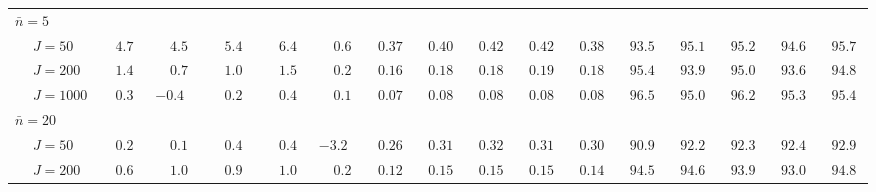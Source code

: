 \begin{sidewaystable}
\begin{threeparttable}
\begin{tabular}{llccccccccccccccc}
\multicolumn{4}{l}{$\bar{n}=5$} \\  & \nopagebreak $\;J=50$  & $\phantom{-}4.7\phantom{0}$ & $\phantom{-}4.5\phantom{0}$ & $\phantom{-}5.4\phantom{0}$ & $\phantom{-}6.4\phantom{0}$ & $\phantom{-}0.6\phantom{0}$ & $\phantom{0}0.37\phantom{0}$ & $\phantom{0}0.40\phantom{0}$ & $\phantom{0}0.42\phantom{0}$ & $\phantom{0}0.42\phantom{0}$ & $\phantom{0}0.38\phantom{0}$ & $\phantom{0}93.5\phantom{0}$ & $\phantom{0}95.1\phantom{0}$ & $\phantom{0}95.2\phantom{0}$ & $\phantom{0}94.6\phantom{0}$ & $\phantom{0}95.7\phantom{0}$ \\
 & \nopagebreak $\;J=200$  & $\phantom{-}1.4\phantom{0}$ & $\phantom{-}0.7\phantom{0}$ & $\phantom{-}1.0\phantom{0}$ & $\phantom{-}1.5\phantom{0}$ & $\phantom{-}0.2\phantom{0}$ & $\phantom{0}0.16\phantom{0}$ & $\phantom{0}0.18\phantom{0}$ & $\phantom{0}0.18\phantom{0}$ & $\phantom{0}0.19\phantom{0}$ & $\phantom{0}0.18\phantom{0}$ & $\phantom{0}95.4\phantom{0}$ & $\phantom{0}93.9\phantom{0}$ & $\phantom{0}95.0\phantom{0}$ & $\phantom{0}93.6\phantom{0}$ & $\phantom{0}94.8\phantom{0}$ \\
 & \nopagebreak $\;J=1000$  & $\phantom{-}0.3\phantom{0}$ & ${-}0.4\phantom{0}$ & $\phantom{-}0.2\phantom{0}$ & $\phantom{-}0.4\phantom{0}$ & $\phantom{-}0.1\phantom{0}$ & $\phantom{0}0.07\phantom{0}$ & $\phantom{0}0.08\phantom{0}$ & $\phantom{0}0.08\phantom{0}$ & $\phantom{0}0.08\phantom{0}$ & $\phantom{0}0.08\phantom{0}$ & $\phantom{0}96.5\phantom{0}$ & $\phantom{0}95.0\phantom{0}$ & $\phantom{0}96.2\phantom{0}$ & $\phantom{0}95.3\phantom{0}$ & $\phantom{0}95.4\phantom{0}$ \\
\multicolumn{4}{l}{$\bar{n}=20$} \\  & \nopagebreak $\;J=50$  & $\phantom{-}0.2\phantom{0}$ & $\phantom{-}0.1\phantom{0}$ & $\phantom{-}0.4\phantom{0}$ & $\phantom{-}0.4\phantom{0}$ & ${-}3.2\phantom{0}$ & $\phantom{0}0.26\phantom{0}$ & $\phantom{0}0.31\phantom{0}$ & $\phantom{0}0.32\phantom{0}$ & $\phantom{0}0.31\phantom{0}$ & $\phantom{0}0.30\phantom{0}$ & $\phantom{0}90.9\phantom{0}$ & $\phantom{0}92.2\phantom{0}$ & $\phantom{0}92.3\phantom{0}$ & $\phantom{0}92.4\phantom{0}$ & $\phantom{0}92.9\phantom{0}$ \\
 & \nopagebreak $\;J=200$  & $\phantom{-}0.6\phantom{0}$ & $\phantom{-}1.0\phantom{0}$ & $\phantom{-}0.9\phantom{0}$ & $\phantom{-}1.0\phantom{0}$ & $\phantom{-}0.2\phantom{0}$ & $\phantom{0}0.12\phantom{0}$ & $\phantom{0}0.15\phantom{0}$ & $\phantom{0}0.15\phantom{0}$ & $\phantom{0}0.15\phantom{0}$ & $\phantom{0}0.14\phantom{0}$ & $\phantom{0}94.5\phantom{0}$ & $\phantom{0}94.6\phantom{0}$ & $\phantom{0}93.9\phantom{0}$ & $\phantom{0}93.0\phantom{0}$ & $\phantom{0}94.8\phantom{0}$ \\

\end{tabular}
\end{threeparttable}
\end{sidewaystable}
